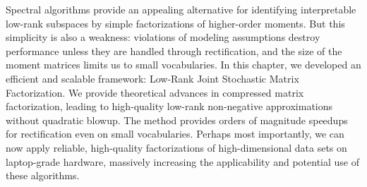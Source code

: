 Spectral algorithms provide an appealing alternative for identifying
interpretable low\hyp{}rank subspaces by simple factorizations of
higher\hyp{}order moments. But this simplicity is also a weakness: violations of
modeling assumptions destroy performance unless they are handled through
rectification, and the size of the moment matrices limits us to small
vocabularies. In this chapter, we developed an efficient and scalable framework:
Low\hyp{}Rank Joint Stochastic Matrix Factorization. We provide theoretical
advances in compressed matrix factorization, leading to high\hyp{}quality
low\hyp{}rank non\hyp{}negative approximations without quadratic blowup. The
method provides orders of magnitude speedups for rectification even on small
vocabularies. Perhaps most importantly, we can now apply reliable,
high\hyp{}quality factorizations of high\hyp{}dimensional data sets on 
laptop\hyp{}grade hardware, massively increasing the applicability and potential
use of these algorithms.